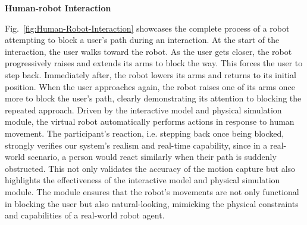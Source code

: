 \textbf{Human-robot Interaction}

Fig.~\ref{fig:Human-Robot-Interaction} showcases the complete process of a robot attempting to block a user's path during an interaction.
At the start of the interaction, the user walks toward the robot. As the user gets closer, the robot progressively raises and extends its arms to block the way. This forces the user to step back. Immediately after, the robot lowers its arms and returns to its initial position. When the user approaches again, the robot raises one of its arms once more to block the user's path, clearly demonstrating its attention to blocking the repeated approach. Driven by the interactive model and physical simulation module, the virtual robot automatically performs actions in response to human movement. The participant's reaction, i.e. stepping back once being blocked, strongly verifies our system's realism and real-time capability, since in a real-world scenario, a person would react similarly when their path is suddenly obstructed. This not only validates the accuracy of the motion capture but also highlights the effectiveness of the interactive model and physical simulation module. The module ensures that the robot's movements are not only functional in blocking the user but also natural-looking, mimicking the physical constraints and capabilities of a real-world robot agent.




